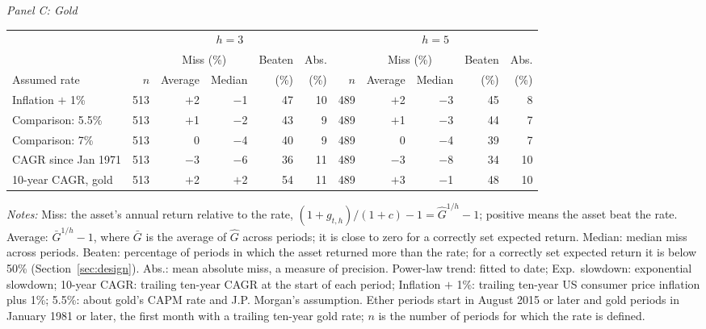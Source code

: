 \documentclass[12pt]{article}
\theoremstyle{plain}
\theoremstyle{remark}
\begin{document}
\begin{table}[H]
\medskip
\textit{Panel C: Gold}\\[2pt]
\begin{tabular}{lrrrrr@{\hspace{6pt}}rrrrr}
\toprule
 & \multicolumn{5}{c}{$h=3$} & \multicolumn{5}{c}{$h=5$}\\
\cmidrule(lr){2-6}\cmidrule(lr){7-11}
 & & \multicolumn{2}{c}{Miss (\%)} & Beaten & Abs. & & \multicolumn{2}{c}{Miss (\%)} & Beaten & Abs.\\
\cmidrule(lr){3-4}\cmidrule(lr){8-9}
Assumed rate & $n$ & Average & Median & (\%) & (\%) & $n$ & Average & Median & (\%) & (\%)\\
\midrule
Inflation $+$ 1\% & 513 & $+$2 & $-$1 & 47 & 10 & 489 & $+$2 & $-$3 & 45 & 8 \\
Comparison: 5.5\% & 513 & $+$1 & $-$2 & 43 & 9 & 489 & $+$1 & $-$3 & 44 & 7 \\
Comparison: 7\% & 513 & 0 & $-$4 & 40 & 9 & 489 & 0 & $-$4 & 39 & 7 \\
CAGR since Jan 1971 & 513 & $-$3 & $-$6 & 36 & 11 & 489 & $-$3 & $-$8 & 34 & 10 \\
10-year CAGR, gold & 513 & $+$2 & $+$2 & 54 & 11 & 489 & $+$3 & $-$1 & 48 & 10 \\
\bottomrule
\end{tabular}
\par\smallskip
\begin{minipage}{\textwidth}\footnotesize
\emph{Notes:} Miss: the asset's annual return relative to the rate, $(1+g_{t,h})/(1+c)-1=\widehat{G}^{1/h}-1$; positive means the asset beat the rate. Average: $\bar{G}^{1/h}-1$, where $\bar{G}$ is the average of $\widehat{G}$ across periods; it is close to zero for a correctly set expected return. Median: median miss across periods. Beaten: percentage of periods in which the asset returned more than the rate; for a correctly set expected return it is below 50\% (Section~\ref{sec:design}). Abs.: mean absolute miss, a measure of precision. Power-law trend: fitted to date; Exp.\ slowdown: exponential slowdown; 10-year CAGR: trailing ten-year CAGR at the start of each period; Inflation $+$ 1\%: trailing ten-year US consumer price inflation plus 1\%; 5.5\%: about gold's CAPM rate and J.P. Morgan's assumption. Ether periods start in August 2015 or later and gold periods in January 1981 or later, the first month with a trailing ten-year gold rate; $n$ is the number of periods for which the rate is defined.
\end{minipage}
\end{table}
\end{document}
